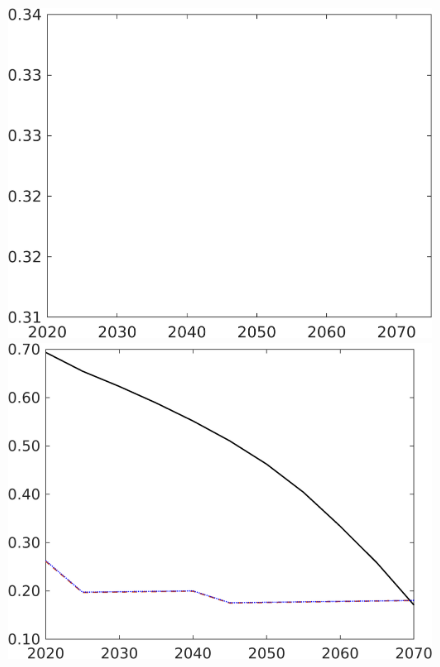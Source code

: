 \begin{figure}[h!!]
\begin{minipage}[]{0.32\textwidth}
	\end{minipage}
	\begin{minipage}[]{0.32\textwidth}
		\includegraphics[width=1\textwidth]{../../codding_model/own_basedOnFried/optimalPol_190722_tidiedUp/figures/all_July22/hl_DDCompEffOPT_T_NoTaus_pol4_spillover0_noskill1_sep1_xgrowth0_etaa0.79_lgd0_lff0.png}
	\end{minipage}
	\begin{minipage}[]{0.32\textwidth}
		\includegraphics[width=1\textwidth]{../../codding_model/own_basedOnFried/optimalPol_190722_tidiedUp/figures/all_July22/gAagg_DDCompEffOPT_T_NoTaus_pol4_spillover0_noskill1_sep1_xgrowth0_etaa0.79_lgd0_lff0.png}

\end{minipage}
\end{figure}
